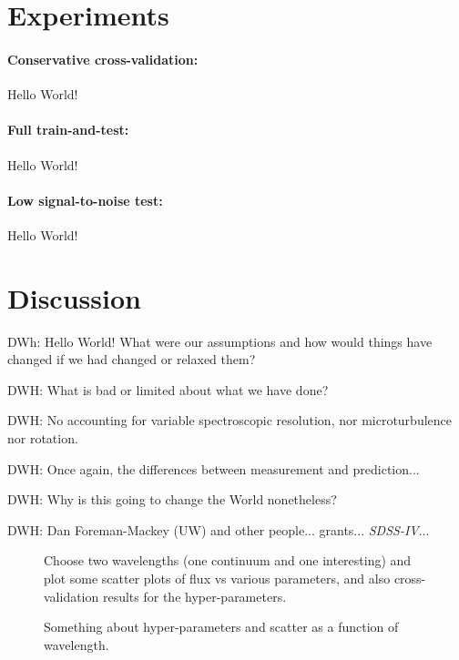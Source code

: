 \documentclass[12pt,preprint]{aastex}
\newcommand{\project}[1]{\textsl{#1}}
\newcommand{\acronym}[1]{\small{#1}}
\newcommand{\sdss}{\project{\acronym{SDSS-IV}}}
\begin{document}
\section{Experiments}

\paragraph{Conservative cross-validation:}
Hello World!

\paragraph{Full train-and-test:}
Hello World!

\paragraph{Low signal-to-noise test:}
Hello World!

\section{Discussion}

DWh:  Hello World!  What were our assumptions and how would things have
changed if we had changed or relaxed them?

DWH:  What is bad or limited about what we have done?

DWH: No accounting for variable spectroscopic resolution, nor
microturbulence nor rotation.

DWH:  Once again, the differences between measurement and prediction...

DWH:  Why is this going to change the World nonetheless?

\acknowledgements
DWH: Dan Foreman-Mackey (UW) and other people...
grants...
\sdss...

\clearpage

\begin{figure}[p]
\caption{Choose two wavelengths (one continuum and one interesting)
  and plot some scatter plots of flux vs various parameters, and also
  cross-validation results for the
  hyper-parameters.\label{fig:onewavelength}}
\end{figure}

\begin{figure}[p]
\caption{Something about hyper-parameters and scatter as a function of
  wavelength.\label{fig:hyperpars}}
\end{figure}
\end{document}
